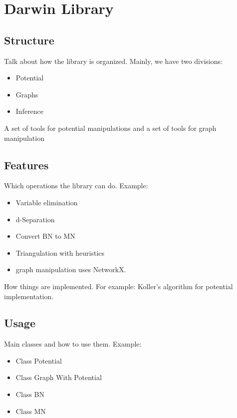 \chapter{Darwin Library}
\label{sec:darwin_lib}


\section{Structure}
\label{sec:system:sec1}

Talk about how the library is organized.
Mainly, we have two divisions:

\begin{itemize}
  \item Potential
  \item Graphs
  \item Inference
\end{itemize}

A set of tools for potential manipulations and a set of tools for graph manipulation

\section{Features}
\label{sec:system:sec2}

Which operations the library can do.
Example:

\begin{itemize}
  \item Variable elimination
  \item d-Separation
  \item Convert BN to MN
  \item Triangulation with heuristics
  \item graph manipulation uses NetworkX.
\end{itemize}

How things are implemented.
For example: Koller's algorithm for potential implementation.

\section{Usage}
\label{sec:system:sec3}

Main classes and how to use them.
Example:

\begin{itemize}
  \item Class Potential
  \item Class Graph With Potential
  \item Class BN
  \item Class MN
\end{itemize}
